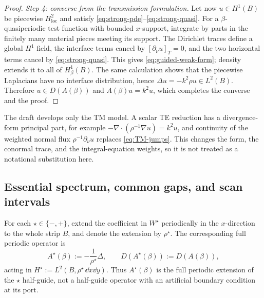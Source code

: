 \begin{proof}
\emph{Step 4: converse from the transmission formulation.}
Let now $u\in H^1(B)$ be piecewise $H^2_{\mathrm{loc}}$ and satisfy
\eqref{eq:strong-pde}--\eqref{eq:strong-quasi}.  For a
$\beta$-quasiperiodic test function with bounded $x$-support, integrate by
parts in the finitely many material pieces meeting its support.  The
Dirichlet traces define a global $H^1$ field, the interface terms cancel by
$[\partial_\nu u]_{\Upsilon}=0$, and the two horizontal terms cancel by
\eqref{eq:strong-quasi}.  This gives \eqref{eq:guided-weak-form}; density
extends it to all of $H^1_\beta(B)$.  The same calculation shows that the
piecewise Laplacians have no interface distribution, hence
$\Delta u=-k^2\rho u\in L^2(B)$.  Therefore $u\in D(A(\beta))$ and
$A(\beta)u=k^2u$, which completes the converse and the proof.
\end{proof}

\begin{remark}[TE polarization]
The draft develops only the TM model.  A scalar TE reduction has a
divergence-form principal part, for example
$-\nabla\cdot(\rho^{-1}\nabla u)=k^2u$, and continuity of the weighted normal
flux $\rho^{-1}\partial_\nu u$ replaces \eqref{eq:TM-jumps}.  This changes the form,
the conormal trace, and the integral-equation weights, so it is not treated as
a notational substitution here.
\end{remark}

\subsection{Essential spectrum, common gaps, and scan intervals}

For each $\star\in\{-,+\}$, extend the coefficient in $W^\star$
periodically in the $x$-direction to the whole strip $B$, and denote the
extension by $\rho^\star$.  The corresponding full periodic operator is
\begin{equation}
  A^\star(\beta):=-\frac{1}{\rho^\star}\Delta,\qquad
  D(A^\star(\beta)):=D(A(\beta)),
  \label{eq:background-operators}
\end{equation}
acting in $H^\star:=L^2(B,\rho^\star\,\dd x\dd y)$.  Thus
$A^\star(\beta)$ is the full periodic extension of the $\star$ half-guide,
not a half-guide operator with an artificial boundary condition at its port.

